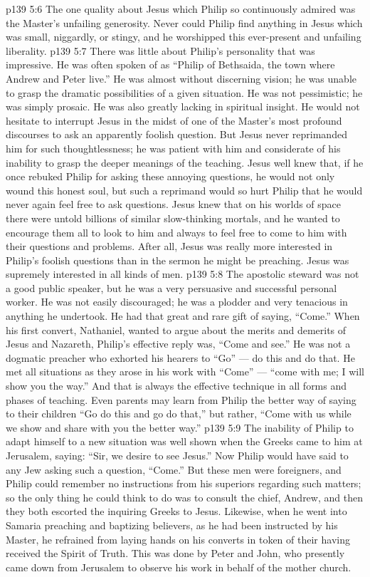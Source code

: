 \vs p139 5:6 The one quality about Jesus which Philip so continuously admired was the Master’s unfailing generosity. Never could Philip find anything in Jesus which was small, niggardly, or stingy, and he worshipped this ever\hyp{}present and unfailing liberality.
\vs p139 5:7 \pc There was little about Philip’s personality that was impressive. He was often spoken of as “Philip of Bethsaida, the town where Andrew and Peter live.” He was almost without discerning vision; he was unable to grasp the dramatic possibilities of a given situation. He was not pessimistic; he was simply prosaic. He was also greatly lacking in spiritual insight. He would not hesitate to interrupt Jesus in the midst of one of the Master’s most profound discourses to ask an apparently foolish question. But Jesus never reprimanded him for such thoughtlessness; he was patient with him and considerate of his inability to grasp the deeper meanings of the teaching. Jesus well knew that, if he once rebuked Philip for asking these annoying questions, he would not only wound this honest soul, but such a reprimand would so hurt Philip that he would never again feel free to ask questions. Jesus knew that on his worlds of space there were untold billions of similar slow\hyp{}thinking mortals, and he wanted to encourage them all to look to him and always to feel free to come to him with their questions and problems. After all, Jesus was really more interested in Philip’s foolish questions than in the sermon he might be preaching. Jesus was supremely interested in  all kinds of men.
\vs p139 5:8 The apostolic steward was not a good public speaker, but he was a very persuasive and successful personal worker. He was not easily discouraged; he was a plodder and very tenacious in anything he undertook. He had that great and rare gift of saying, “Come.” When his first convert, Nathaniel, wanted to argue about the merits and demerits of Jesus and Nazareth, Philip’s effective reply was, “Come and see.” He was not a dogmatic preacher who exhorted his hearers to “Go” --- do this and do that. He met all situations as they arose in his work with “Come” --- “come with me; I will show you the way.” And that is always the effective technique in all forms and phases of teaching. Even parents may learn from Philip the better way of saying to their children  “Go do this and go do that,” but rather, “Come with us while we show and share with you the better way.”
\vs p139 5:9 The inability of Philip to adapt himself to a new situation was well shown when the Greeks came to him at Jerusalem, saying: “Sir, we desire to see Jesus.” Now Philip would have said to any Jew asking such a question, “Come.” But these men were foreigners, and Philip could remember no instructions from his superiors regarding such matters; so the only thing he could think to do was to consult the chief, Andrew, and then they both escorted the inquiring Greeks to Jesus. Likewise, when he went into Samaria preaching and baptizing believers, as he had been instructed by his Master, he refrained from laying hands on his converts in token of their having received the Spirit of Truth. This was done by Peter and John, who presently came down from Jerusalem to observe his work in behalf of the mother church.
